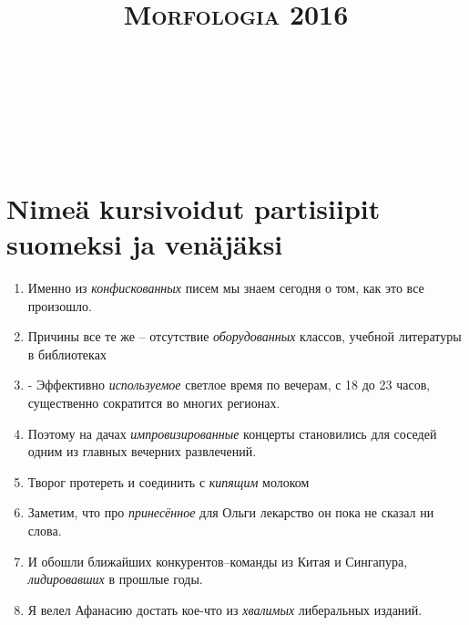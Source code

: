 \documentclass[paper=a4, fontsize=11pt]{scrartcl}
\title{	
\normalfont \normalsize 
\textsc{Morfologia 2016} \\ [25pt] 
\horrule{0.5pt} \\[0.4cm] 
\huge  \\ 
\horrule{2pt} \\[0.5cm] 
}
\date{}
\begin{document}
\onehalfspacing

\section{Nimeä kursivoidut partisiipit suomeksi ja venäjäksi}\label{kuxe4uxe4nnuxe4-venuxe4juxe4ksi}

\begin{enumerate}
    \item Именно из \emph{конфискованных} писем мы знаем сегодня о том, как это все произошло. \\
    \underline{\hspace{12cm}}
    \item Причины все те же -- отсутствие \emph{оборудованных} классов, учебной литературы в библиотеках\\
    \underline{\hspace{12cm}}
    \item - Эффективно \emph{используемое} светлое время по вечерам, с 18 до 23 часов, существенно сократится во многих регионах. \\
    \underline{\hspace{12cm}}
    \item Поэтому на дачах \emph{импровизированные} концерты становились для соседей одним из главных вечерних развлечений.  \\
    \underline{\hspace{12cm}}
    \item Творог протереть и соединить с \emph{кипящим} молоком \\
    \underline{\hspace{12cm}}
    \item Заметим, что про \emph{принесённое} для Ольги лекарство он пока не сказал ни слова. \\
    \underline{\hspace{12cm}}
    \item И обошли ближайших конкурентов--команды из Китая и Сингапура, \emph{лидировавших} в прошлые годы. \\
    \underline{\hspace{12cm}}
    \item Я велел Афанасию достать кое-что из \emph{хвалимых} либеральных изданий. \\
    \underline{\hspace{12cm}}

\end{enumerate}
\end{document}
